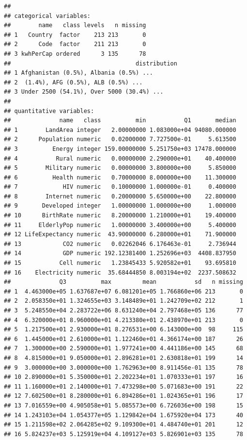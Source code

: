 \documentclass[]{book}
\begin{document}
\begin{verbatim}
## 
## categorical variables:  
##        name   class levels   n missing
## 1   Country  factor    213 213       0
## 2      Code  factor    211 213       0
## 3 kwhPerCap ordered      3 135      78
##                                    distribution
## 1 Afghanistan (0.5%), Albania (0.5%) ...       
## 2  (1.4%), AFG (0.5%), ALB (0.5%) ...          
## 3 Under 2500 (54.1%), Over 5000 (30.4%) ...    
## 
## quantitative variables:  
##              name   class          min           Q1       median
## 1        LandArea integer   2.00000000 1.083000e+04 94080.000000
## 2      Population numeric   0.02000000 7.727500e-01     5.613500
## 3          Energy integer 159.00000000 5.251750e+03 17478.000000
## 4           Rural numeric   0.00000000 2.290000e+01    40.400000
## 5        Military numeric   0.00000000 3.800000e+00     5.850000
## 6          Health numeric   0.70000000 8.000000e+00    11.300000
## 7             HIV numeric   0.10000000 1.000000e-01     0.400000
## 8        Internet numeric   0.20000000 5.650000e+00    22.800000
## 9       Developed integer   1.00000000 1.000000e+00     1.000000
## 10      BirthRate numeric   8.20000000 1.210000e+01    19.400000
## 11     ElderlyPop numeric   1.00000000 3.400000e+00     5.400000
## 12 LifeExpectancy numeric  43.90000000 6.280000e+01    71.900000
## 13            CO2 numeric   0.02262046 6.176463e-01     2.736944
## 14            GDP numeric 192.12381400 1.252696e+03  4408.837950
## 15           Cell numeric   1.23845433 5.920582e+01    93.695810
## 16    Electricity numeric  35.68444850 8.003194e+02  2237.508632
##              Q3          max         mean           sd   n missing
## 1  4.463000e+05 1.637687e+07 6.081201e+05 1.766860e+06 213       0
## 2  2.058350e+01 1.324655e+03 3.148489e+01 1.242709e+02 212       1
## 3  5.248550e+04 2.283722e+06 8.631240e+04 2.797468e+05 136      77
## 4  6.320000e+01 8.960000e+01 4.213380e+01 2.438970e+01 213       0
## 5  1.217500e+01 2.930000e+01 8.276531e+00 6.143000e+00  98     115
## 6  1.445000e+01 2.610000e+01 1.122460e+01 4.366174e+00 187      26
## 7  1.300000e+00 2.590000e+01 1.977241e+00 4.441186e+00 145      68
## 8  4.815000e+01 9.050000e+01 2.896281e+01 2.630818e+01 199      14
## 9  3.000000e+00 3.000000e+00 1.762963e+00 8.911456e-01 135      78
## 10 2.890000e+01 5.350000e+01 2.202234e+01 1.070333e+01 197      16
## 11 1.160000e+01 2.140000e+01 7.473298e+00 5.071683e+00 191      22
## 12 7.602500e+01 8.280000e+01 6.894286e+01 1.024365e+01 196      17
## 13 7.016559e+00 4.905058e+01 5.085573e+00 6.726036e+00 198      15
## 14 1.243103e+04 1.054377e+05 1.129842e+04 1.675920e+04 173      40
## 15 1.211598e+02 2.064285e+02 9.109300e+01 4.484740e+01 201      12
## 16 5.824237e+03 5.125919e+04 4.109127e+03 5.826901e+03 135      78
\end{verbatim}
\end{document}
